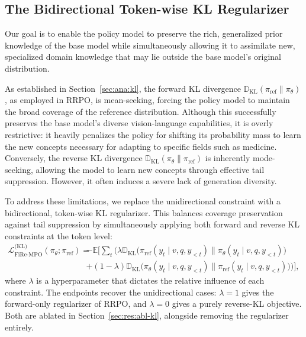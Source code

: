 \subsection{The Bidirectional Token-wise KL Regularizer}
\label{sec:met:kl}

Our goal is to enable the policy model to preserve the rich, generalized prior knowledge of the base model while simultaneously allowing it to assimilate new, specialized domain knowledge that may lie outside the base model's original distribution.

As established in Section~\ref{sec:ana:kl}, the forward KL divergence $\mathbb{D}_{\text{KL}}(\pi_{\text{ref}} \parallel \pi_\theta)$, as employed in RRPO, is mean-seeking, forcing the policy model to maintain the broad coverage of the reference distribution. Although this successfully preserves the base model's diverse vision-language capabilities, it is overly restrictive: it heavily penalizes the policy for shifting its probability mass to learn the new concepts necessary for adapting to specific fields such as medicine. Conversely, the reverse KL divergence $\mathbb{D}_{\text{KL}}(\pi_\theta \parallel \pi_{\text{ref}})$ is inherently mode-seeking, allowing the model to learn new concepts through effective tail suppression. However, it often induces a severe lack of generation diversity.

To address these limitations, we replace the unidirectional constraint with a bidirectional, token-wise KL regularizer. This balances coverage preservation against tail suppression by simultaneously applying both forward and reverse KL constraints at the token level:
\begin{equation}\label{eq:firempo-kl}
\begin{split}
\mathcal{L}^{\text{(KL)}}_{\text{FiRe-MPO}}(\pi_\theta; \pi_{\text{ref}}) = &
- \mathbb{E} \biggl[ \sum_t \Big( \lambda \mathbb{D}_{\text{KL}} \big(\pi_{\text{ref}}(y_t \mid v,q,y_{<t}) \parallel \pi_\theta(y_t \mid v,q,y_{<t}) \big) \\
& + (1-\lambda) \mathbb{D}_{\text{KL}} \big(\pi_\theta(y_t \mid v,q,y_{<t}) \parallel \pi_{\text{ref}}(y_t \mid v,q,y_{<t}) \big) \Big) \biggr],
\end{split}
\end{equation}
where $\lambda$ is a hyperparameter that dictates the relative influence of each constraint. The endpoints recover the unidirectional cases: $\lambda = 1$ gives the forward-only regularizer of RRPO, and $\lambda = 0$ gives a purely reverse-KL objective. Both are ablated in Section~\ref{sec:res:abl-kl}, alongside removing the regularizer entirely.

